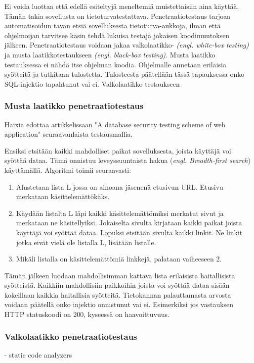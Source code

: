 \documentclass[finnish]{tktltiki2}
\theoremstyle{definition}
\theoremstyle{remark}
\begin{document}
	
	Ei voida luottaa että edellä esiteltyjä meneltemiä muistettaisiin aina käyttää. Tämän takia sovellusta on tietoturvatestattava. Penetraatiotestaus tarjoaa automatisoidun tavan etsiä sovelluksesta tietoturva-aukkoja, ilman että ohjelmoijan tarvitsee käsin tehdä lukuisa testajä jokaisen koodimuutoksen jälkeen. Penetraatiotestaus voidaan jakaa valkolaatikko- \textit{(engl. white-box testing)} ja musta laatikkotestaukseen \textit{(engl. black-box testing)}. Musta laatikko testauksessa ei nähdä itse ohjelman koodia. Ohjelmalle annetaan erilaisia syötteitä ja tutkitaan tulostetta. Tulosteesta päätellään tässä tapauksessa onko SQL-injektio tapahtunut vai ei. Valkolaatikko testaukseen
	
	\subsubsection{Musta laatikko penetraatiotestaus}
	 Haixia edottaa artikkelissaan "A database security testing scheme of web application" \cite{testing} seuraavanlaista testausmallia.
	
	Ensiksi etsitään kaikki mahdolliset paikat sovelluksesta, joista käyttäjä voi syöttää dataa. Tämä onnistuu leveyssuuntaista hakua (\textit{engl. Breadth-first search}) käyttämällä. Algoritmi toimii seuraavasti:
	\begin{enumerate}
		\item Alustetaan lista L jossa on ainoana jäsenenä etusivun URL. Etusivu merkataan käsittelemättökäks.
		
		\item Käydään listalta L läpi kaikki käsittelemättömiksi merkatut sivut ja merkataan ne käsitellyiksi. Jokaiselta sivulta kirjataan kaikki paikat joista käyttäjä voi syöttää dataa. Lopuksi etsitään sivulta kaikki linkit. Ne linkit jotka eivät vielä ole listalla L, lisätään listalle.
		
		\item Mikäli listalla on käsittelemättömiä linkkejä, palataan vaiheeseen 2.
	\end{enumerate}
	
	Tämän jälkeen luodaan mahdollisimman kattava lista erilaisista haitallisista syötteistä. Kaikkiin mahdollisiin paikkoihin joista voi syöttää dataa sisään kokeillaan kaikkia haitallisia syötteitä. Tietokannan palauttamasta arvosta voidaan päätellä onko injektio onnistunut vai ei. Esimerkiksi jos vastauksen HTTP statuskoodi on 200, kyseessä on haavoittuvuus.
	
	\subsubsection{Valkolaatikko penetraatiotestaus}
	- static code analyzers
	
\end{document}

